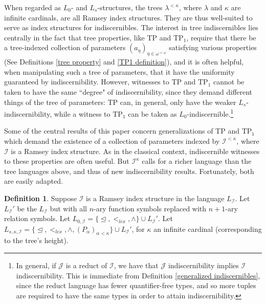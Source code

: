 \documentclass{article}
\newcommand{\calI}{\mathcal{I}}
\newcommand{\calJ}{\mathcal{J}}
\newcommand{\qftp}{\text{qftp}}
\newcommand{\TPi}{\text{TP}_1}
\theoremstyle{definition}
\newtheorem{definition}{Definition}
\theoremstyle{definition}
\theoremstyle{definition}
\theoremstyle{definition}
\begin{document}
When regarded as $L_0$- and $L_s$-structures, the trees $\lambda^{<\kappa}$, where $\lambda$ and $\kappa$ are infinite cardinals, are all Ramsey index structures. They are thus well-suited to serve as index structures for indiscernibles. The interest in  tree indiscernibles lies centrally in the fact that tree properties, like TP and $\TPi$, require that there be a tree-indexed collection of parameters $(a_\eta)_{\eta\in \omega^{<\omega}}$ satisfying various properties (See Definitions \ref{tree property} and \ref{TP1 definition}), and it is often helpful, when manipulating such a tree of parameters, that it have the uniformity guaranteed by indiscernibility. However, witnesses to TP and $\TPi$ cannot be taken to have the same ``degree" of indiscernibility, since they demand different things of the tree of parameters: TP can, in general, only have the weaker $L_s$-indiscernibility, while a witness to $\TPi$ can be taken as $L_0$-indiscernible.\footnote{In general, if $\calJ$ is a reduct of $\calI$, we have that $\calJ$ indiscernibility implies $\calI$ indiscernibility. This is immediate from Definition \ref{generalized indiscernibles}, since the reduct language has fewer quantifier-free types, and so more tuples are required to have the same types in order to attain indiscernibility.} 


Some of the central results of this paper concern generalizations of TP and $\TPi$ which demand the existence of a collection of parameters indexed by $\calI^{<\kappa}$, where $\calI$ is a Ramsey index structure. As in the classical context, indiscernible witnesses to these properties are often useful. But $\calI^{\kappa}$ calls for a richer language than the tree languages above, and thus of new indiscernibility results. Fortunately, both are easily adapted.


\begin{definition}{}\label{I trees}
    Suppose $\calI$ is a Ramsey index structure in the language $L_\calI$. Let $L_\calI'$ be the $L_\calI$ but with all $n$-ary function symbols replaced with $n+1$-ary relation symbols. Let $L_{0, \calI}=\{\trianglelefteq,<_{lex},\land\}\cup L_\calI'$. Let $L_{s,\kappa,\calI}=\{\trianglelefteq,<_{lex},\land,(P_\alpha)_{\alpha<\kappa}\}\cup L_\calI'$, for $\kappa$ an infinite cardinal (corresponding to the tree's height).
    
\end{definition}
\end{document}
